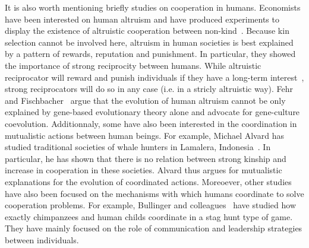     It is also worth mentioning briefly studies on cooperation in humans. Economists have been interested on human altruism and have produced experiments to display the existence of altruistic cooperation between non-kind~\parencite{Fehr2002, Fehr2003a}. Because kin selection cannot be involved here, altruism in human societies is best explained by a pattern of rewards, reputation and punishment. In particular, they showed the importance of strong reciprocity between humans. While altruistic reciprocator will reward and punish individuals if they have a long-term interest~\parencite{Trivers1971}, strong reciprocators will do so in any case (i.e. in a stricly altruistic way). Fehr and Fischbacher~\parencite{Fehr2003a} argue that the evolution of human altruism cannot be only explained by gene-based evolutionary theory alone and advocate for gene-culture coevolution. Additionnaly, some have also been interested in the coordination in mutualistic actions between human beings. For example, Michael Alvard has studied traditional societies of whale hunters in Lamalera, Indonesia~\parencite{Alvard1999, Alvard2003}. In particular, he has shown that there is no relation between strong kinship and increase in cooperation in these societies. Alvard thus argues for mutualistic explanations for the evolution of coordinated actions. Moreoever, other studies have also been focused on the mechanisms with which humans coordinate to solve cooperation problems. For example, Bullinger and colleagues~\parencite{Bullinger2011, Duguid2014} have studied how exactly chimpanzees and human childs coordinate in a stag hunt type of game. They have mainly focused on the role of communication and leadership strategies between individuals.


